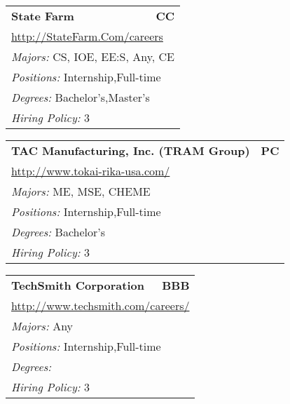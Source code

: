 \documentclass[twoside]{article}
\begin{document}
\begin{center}
\begin{multicols}{3}
\begin{FlushLeft}
\begin{minipage}{.9\columnwidth}
\end{minipage}
 
\begin{minipage}{.9\columnwidth}\begin{tabularx}{.95\columnwidth}{Xr}
                 {\Large\bf State Farm} & {\Large\bf CC}\\
    \multicolumn{2}{p{.95\columnwidth}}{\url{http://StateFarm.Com/careers}}\\
    \multicolumn{2}{p{.95\columnwidth}}{\emph{Majors:} CS, IOE, EE:S, Any, CE}\\
    \multicolumn{2}{p{.95\columnwidth}}{\emph{Positions:} Internship,Full-time}\\
    \multicolumn{2}{p{.95\columnwidth}}{\emph{Degrees:} Bachelor's,Master's}\\
    \multicolumn{2}{p{.95\columnwidth}}{\emph{Hiring Policy:} 3}\\
    \end{tabularx}
    
\end{minipage}
 
\begin{minipage}{.9\columnwidth}\begin{tabularx}{.95\columnwidth}{Xr}
                 {\Large\bf TAC Manufacturing, Inc. (TRAM Group)} & {\Large\bf PC}\\
    \multicolumn{2}{p{.95\columnwidth}}{\url{http://www.tokai-rika-usa.com/}}\\
    \multicolumn{2}{p{.95\columnwidth}}{\emph{Majors:} ME, MSE, CHEME}\\
    \multicolumn{2}{p{.95\columnwidth}}{\emph{Positions:} Internship,Full-time}\\
    \multicolumn{2}{p{.95\columnwidth}}{\emph{Degrees:} Bachelor's}\\
    \multicolumn{2}{p{.95\columnwidth}}{\emph{Hiring Policy:} 3}\\
    \end{tabularx}
    
\end{minipage}
 
\begin{minipage}{.9\columnwidth}\begin{tabularx}{.95\columnwidth}{Xr}
                 {\Large\bf TechSmith Corporation} & {\Large\bf BBB}\\
    \multicolumn{2}{p{.95\columnwidth}}{\url{http://www.techsmith.com/careers/}}\\
    \multicolumn{2}{p{.95\columnwidth}}{\emph{Majors:} Any}\\
    \multicolumn{2}{p{.95\columnwidth}}{\emph{Positions:} Internship,Full-time}\\
    \multicolumn{2}{p{.95\columnwidth}}{\emph{Degrees:} }\\
    \multicolumn{2}{p{.95\columnwidth}}{\emph{Hiring Policy:} 3}\\
    \end{tabularx}
    

\end{minipage}
\end{FlushLeft}
\end{multicols}
\end{center}
\end{document}

